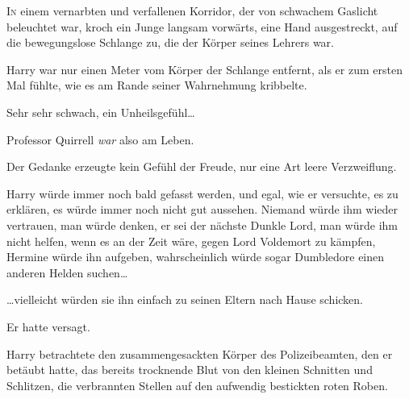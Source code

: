 
\lettrine{I}{n} einem vernarbten und verfallenen Korridor, der von schwachem Gaslicht beleuchtet war, kroch ein Junge langsam vorwärts, eine Hand ausgestreckt, auf die bewegungslose Schlange zu, die der Körper seines Lehrers war.

Harry war nur einen Meter vom Körper der Schlange entfernt, als er zum ersten Mal fühlte, wie es am Rande seiner Wahrnehmung kribbelte.

Sehr sehr schwach, ein Unheilsgefühl…

Professor Quirrell \emph{war} also am Leben.

Der Gedanke erzeugte kein Gefühl der Freude, nur eine Art leere Verzweiflung.

Harry würde immer noch bald gefasst werden, und egal, wie er versuchte, es zu erklären, es würde immer noch nicht gut aussehen. Niemand würde ihm wieder vertrauen, man würde denken, er sei der nächste Dunkle Lord, man würde ihm nicht helfen, wenn es an der Zeit wäre, gegen Lord Voldemort zu kämpfen, Hermine würde ihn aufgeben, wahrscheinlich würde sogar Dumbledore einen anderen Helden suchen…

…vielleicht würden sie ihn einfach zu seinen Eltern nach Hause schicken.

Er hatte versagt.

Harry betrachtete den zusammengesackten Körper des Polizeibeamten, den er betäubt hatte, das bereits trocknende Blut von den kleinen Schnitten und Schlitzen, die verbrannten Stellen auf den aufwendig bestickten roten Roben.

